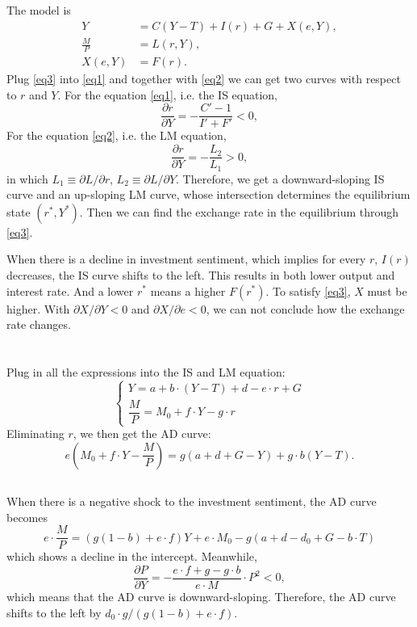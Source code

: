 \documentclass{article}
\begin{document}
\section{}
The model is
\begin{align}
    Y &= C(Y - T) + I(r) + G + X(e, Y), \label{eq1}\\
    \frac{M}{P} &= L(r, Y), \label{eq2}\\
    X(e, Y) &= F(r). \label{eq3}
\end{align}
Plug \eqref{eq3} into \eqref{eq1} and together with \eqref{eq2} we can get two curves with respect to $r$ and $Y$.
For the equation \eqref{eq1}, i.e. the IS equation,
\[
    \frac{\partial r}{\partial Y}
    = -\frac{C' - 1}{I' + F'} < 0,
\]
For the equation \eqref{eq2}, i.e. the LM equation, 
\[
    \frac{\partial r}{\partial Y}
    = -\frac{L_2}{L_1} > 0,
\]
in which $L_1 \equiv \partial L / \partial r$, $L_2 \equiv \partial L / \partial Y$. Therefore, we get a downward-sloping IS curve and an up-sloping LM curve, whose intersection determines the equilibrium state $(r^\ast, Y^\ast)$. Then we can find the exchange rate in the equilibrium through \eqref{eq3}.

When there is a decline in investment sentiment, which implies for every $r$, $I(r)$ decreases, the IS curve shifts to the left. This results in both lower output and interest rate. And a lower $r^\ast$ means a higher $F(r^\ast)$. To satisfy \eqref{eq3}, $X$ must be higher. With $\partial X / \partial Y < 0$ and $\partial X / \partial e < 0$, we can not conclude how the exchange rate changes.

\section{}
\subsection{}
Plug in all the expressions into the IS and LM equation:
\[
    \begin{cases}
        Y = a + b \cdot (Y - T) + d - e \cdot r + G \\
        \dfrac{M}{P} = M_0 + f \cdot Y - g \cdot r
    \end{cases}
\]
Eliminating $r$, we then get the AD curve:
\[
    e \left(M_0 + f \cdot Y - \frac{M}{P}\right)
    = g (a + d + G - Y) + g \cdot b  (Y - T).
\]

\subsection{}
When there is a negative shock to the investment sentiment, the AD curve becomes
\[
    e \cdot \frac{M}{P} = \left(g (1 - b) + e \cdot f\right) Y + e \cdot M_0 - g(a + d - d_0 + G - b \cdot T)
\]
which shows a decline in the intercept. Meanwhile,
\[
    \frac{\partial P}{\partial Y}
    = -\frac{e \cdot f + g - g \cdot b}{e \cdot M} \cdot P^2 < 0,
\]
which means that the AD curve is downward-sloping. Therefore, the AD curve shifts to the left by $d_0 \cdot g / (g(1-b) + e\cdot f)$.
\end{document}
